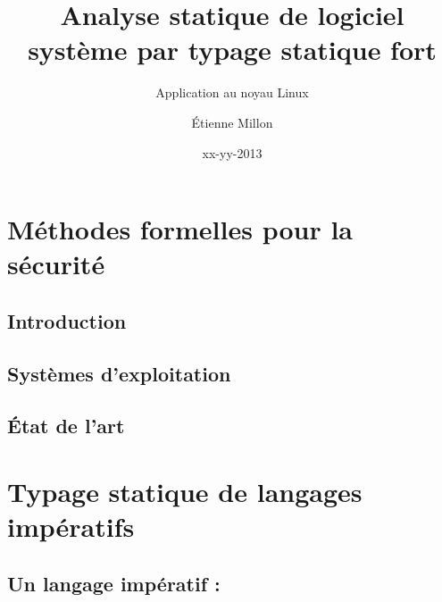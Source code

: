 \documentclass[a4paper,11pt]{memoir}
\title{Analyse statique de logiciel système par typage statique fort}
\subtitle{Application au noyau Linux}
\author{Étienne Millon}
\date{xx-yy-2013}
\begin{document}
\frontmatter

\begin{titlingpage}
\titleUL{}
\end{titlingpage}

\cleartorecto

\asuabstract



\asuacknowledgements




\tableofcontents

\mainmatter

\part{Méthodes formelles pour la sécurité}
\label{part:ctx}



\chapter{Introduction}


\chapter{Systèmes d'exploitation}

\label{cha:os}



%

\chapter{État de l'art}



\part{Typage statique de langages impératifs}
\label{part:lang}



\chapter{Un langage impératif : \langname}
\end{document}
